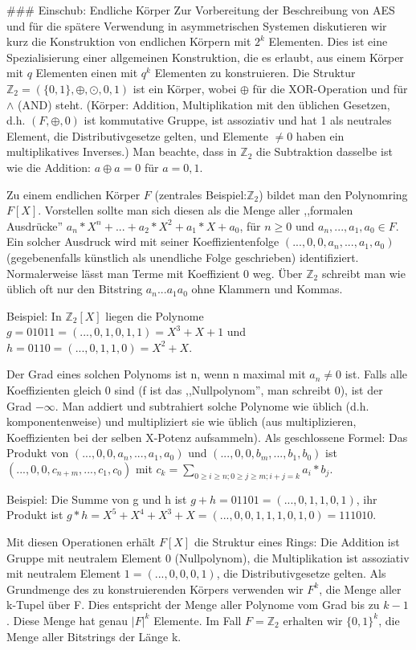 \documentclass[a4paper]{article}
\begin{document}
\begin{multicols}{3}
### Einschub: Endliche Körper
Zur Vorbereitung der Beschreibung von AES und für die spätere Verwendung in asymmetrischen Systemen diskutieren wir kurz die Konstruktion von endlichen Körpern mit $2^k$ Elementen. Dies ist eine Spezialisierung einer allgemeinen Konstruktion, die es erlaubt, aus einem Körper mit $q$ Elementen einen mit $q^k$ Elementen zu konstruieren.
Die Struktur $\mathbb{Z}_2=(\{0,1\},\oplus,\odot, 0 ,1)$ ist ein Körper, wobei $\oplus$ für die XOR-Operation und für $\wedge$ (AND) steht. (Körper: Addition, Multiplikation mit den üblichen Gesetzen, d.h. $(F,\oplus ,0)$ ist kommutative Gruppe, ist assoziativ und hat 1 als neutrales Element, die Distributivgesetze gelten, und Elemente $\not=0$ haben ein multiplikatives Inverses.) Man beachte, dass in $\mathbb{Z}_2$ die Subtraktion dasselbe ist wie die Addition: $a\oplus a= 0$ für $a=0,1$.

Zu einem endlichen Körper $F$ (zentrales Beispiel:$\mathbb{Z}_2$) bildet man den Polynomring $F[X]$. Vorstellen sollte man sich diesen als die Menge aller ,,formalen Ausdrücke'' $a_n* X^n+...+a_2 *X^2 +a_1 *X+a_0$, für $n\geq 0$ und $a_n,...,a_1,a_0\in F$. Ein solcher Ausdruck wird mit seiner Koeffizientenfolge $(...,0,0,a_n,...,a_1,a_0)$ (gegebenenfalls künstlich als unendliche Folge geschrieben) identifiziert. Normalerweise lässt man Terme mit Koeffizient 0 weg. Über $\mathbb{Z}_2$ schreibt man wie üblich oft nur den Bitstring $a_n...a_1a_0$ ohne Klammern und Kommas.

Beispiel: In $\mathbb{Z}_2[X]$ liegen die Polynome $g=01011=(..., 0 , 1 , 0 , 1 ,1) =X^3 +X+1$ und $h=0110=(..., 0 , 1 , 1 ,0) =X^2 +X$.

Der Grad eines solchen Polynoms ist n, wenn n maximal mit $a_n\not = 0$ ist. Falls alle Koeffizienten gleich 0 sind (f ist das ,,Nullpolynom'', man schreibt 0), ist der Grad $-\infty$. Man addiert und subtrahiert solche Polynome wie üblich (d.h. komponentenweise) und multipliziert sie wie üblich (aus multiplizieren, Koeffizienten bei der selben X-Potenz aufsammeln). Als geschlossene Formel: Das Produkt von $(...,0,0,a_n,...,a_1,a_0)$ und $(...,0,0,b_m,...,b_1,b_0)$ ist $(...,0,0,c_{n+m},...,c_1,c_0)$ mit $c_k=\sum_{0\geq i\geq n; 0\geq j\geq m; i+j=k} a_i*b_j$.

Beispiel: Die Summe von g und h ist $g+h=01101=(...,0,1,1,0,1)$, ihr Produkt ist $g*h=X^5+X^4+X^3+X=(...,0,0,1,1,1,0,1,0)=111010$.

Mit diesen Operationen erhält $F[X]$ die Struktur eines Rings: Die Addition ist Gruppe mit neutralem Element 0 (Nullpolynom), die Multiplikation ist assoziativ mit neutralem Element $1=(...,0,0,0,1)$, die Distributivgesetze gelten.
Als Grundmenge des zu konstruierenden Körpers verwenden wir $F^k$, die Menge aller k-Tupel über F. Dies entspricht der Menge aller Polynome vom Grad bis zu $k-1$. Diese Menge hat genau $|F|^k$ Elemente. Im Fall $F=\mathbb{Z}_2$ erhalten wir $\{0,1\}^k$, die Menge aller Bitstrings der Länge k.


\end{multicols}
\end{document}
